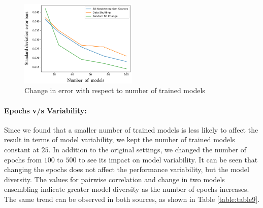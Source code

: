 \begin{figure}[!htb]
	\centering
	\includegraphics[width=0.5\textwidth]{../openreview/graph_1.png}
	\caption{Change in error with respect to number of trained models }
	\label{fig:pic1}	
    \end{figure}
\paragraph{Epochs v/s Variability:}
Since we found that a smaller number of trained models is less likely to affect the result in terms of model variability, we kept the number of trained models constant at $25$. In addition to the original settings, we changed the number of epochs from $100$ to $500$ to see its impact on model variability. It can be seen that changing the epochs does not affect the performance variability, but the model diversity. The values for pairwise correlation and change in two models ensembling indicate greater model diversity as the number of epochs increases. The same trend can be observed in both sources, as shown in Table \ref{table:table9}.
